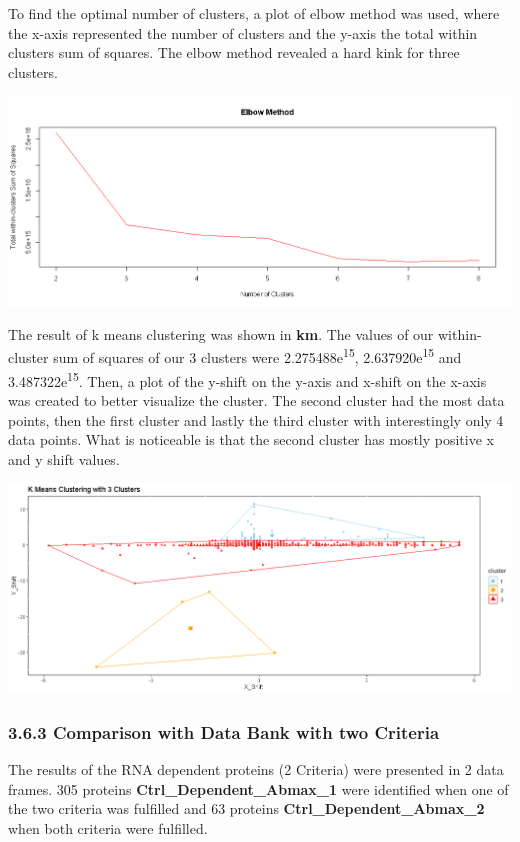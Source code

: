 \documentclass[
]{article}
\begin{document}
To find the optimal number of clusters, a plot of elbow method was used,
where the x-axis represented the number of clusters and the y-axis the
total within clusters sum of squares. The elbow method revealed a hard
kink for three clusters.

\includegraphics{../results/png/Elbow.png}

The result of k means clustering was shown in \textbf{km}. The values of
our within-cluster sum of squares of our 3 clusters were
2.275488e\textsuperscript{15}, 2.637920e\textsuperscript{15} and
3.487322e\textsuperscript{15}. Then, a plot of the y-shift on the y-axis
and x-shift on the x-axis was created to better visualize the cluster.
The second cluster had the most data points, then the first cluster and
lastly the third cluster with interestingly only 4 data points. What is
noticeable is that the second cluster has mostly positive x and y shift
values.

\includegraphics{../results/png/K_Means.png}

\hypertarget{comparison-with-data-bank-with-two-criteria}{%
\subsubsection{3.6.3 Comparison with Data Bank with two
Criteria}\label{comparison-with-data-bank-with-two-criteria}}

The results of the RNA dependent proteins (2 Criteria) were presented in
2 data frames. 305 proteins \textbf{Ctrl\_Dependent\_Abmax\_1} were
identified when one of the two criteria was fulfilled and 63 proteins
\textbf{Ctrl\_Dependent\_Abmax\_2} when both criteria were fulfilled.
\end{document}
